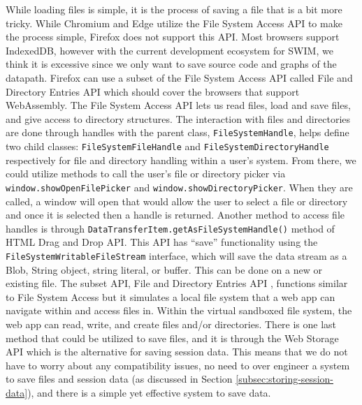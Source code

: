 \documentclass[
    paper=letter,
    parskip=half,
    fontsize=12pt,
    titlepage=firstiscover,
    toc=bibliography,
    numbers=endperiod
]{scrartcl}
\begin{document}
While loading files is simple, it is the process of saving a file that
is a bit more tricky. While Chromium and Edge utilize the File System
Access API to make the process simple, Firefox does not support this
API. Most browsers support IndexedDB, however with the current
development ecosystem for SWIM, we think it is excessive since we only
want to save source code and graphs of the datapath. Firefox can use a
subset of the File System Access API called File and Directory Entries
API which should cover the browsers that support WebAssembly. The File
System Access API lets us read files, load and save files, and give
access to directory structures. The interaction with files and
directories are done through handles with the parent class,
\texttt{FileSystemHandle}, helps define two child classes:
\texttt{FileSystemFileHandle} and \texttt{FileSystemDirectoryHandle}
respectively for file and directory handling within a user's system.
From there, we could utilize methods to call the user's file or
directory picker via \texttt{window.showOpenFilePicker} and
\texttt{window.showDirectoryPicker}. When they are called, a window will
open that would allow the user to select a file or directory and once it
is selected then a handle is returned. Another method to access file
handles is through \texttt{DataTransferItem.getAsFileSystemHandle()}
method of HTML Drag and Drop API. This API has ``save'' functionality
using the \texttt{FileSystemWritableFileStream} interface, which will
save the data stream as a Blob, String object, string literal, or
buffer. This can be done on a new or existing file. The subset API, File
and Directory Entries API \cite{mdn-file-and-directory-entries-api},
functions similar to File System Access but it simulates a local file
system that a web app can navigate within and access files in. Within
the virtual sandboxed file system, the web app can read, write, and
create files and/or directories. There is one last method that could be
utilized to save files, and it is through the Web Storage API which is
the alternative for saving session data. This means that we do not have
to worry about any compatibility issues, no need to over engineer a
system to save files and session data (as discussed in Section
\ref{subsec:storing-session-data}), and there is a simple yet effective
system to save data.
\end{document}
